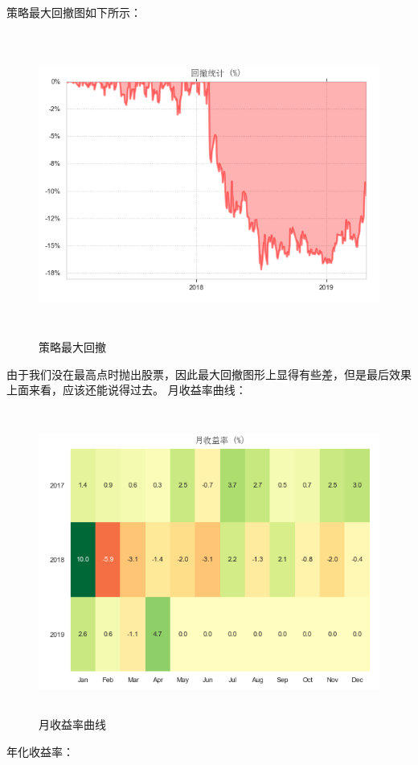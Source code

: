 \documentclass{article}
\begin{document}
策略最大回撤图如下所示：
\begin{figure}[H]
	\caption{策略最大回撤}
	\label{f000060}
	\centering
	\includegraphics[height=10cm]{images/f000060}
\end{figure}
由于我们没在最高点时抛出股票，因此最大回撤图形上显得有些差，但是最后效果上面来看，应该还能说得过去。\newline
月收益率曲线：
\begin{figure}[H]
	\caption{月收益率曲线}
	\label{f000061}
	\centering
	\includegraphics[height=10cm]{images/f000061}
\end{figure}
年化收益率：
\end{document}
